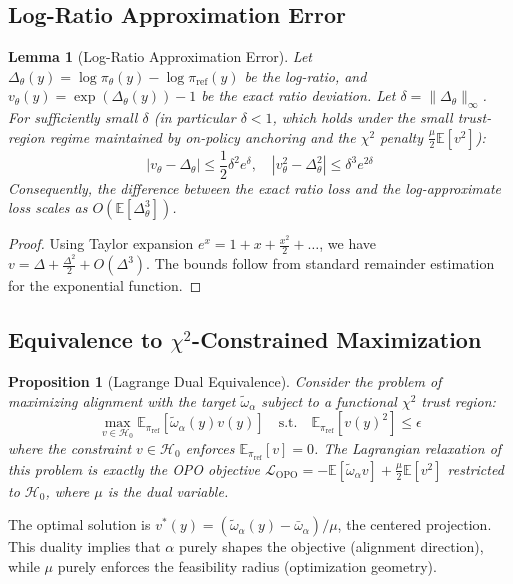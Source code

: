 \documentclass[11pt]{article}
\newtheorem{proposition}[theorem]{Proposition}
\newtheorem{lemma}[theorem]{Lemma}
\theoremstyle{definition}
\theoremstyle{remark}
\newcommand{\E}{\mathbb{E}}
\newcommand{\piref}{\pi_{\mathrm{ref}}}
\begin{document}
\subsection{Log-Ratio Approximation Error}
\begin{lemma}[Log-Ratio Approximation Error]
\label{lem:log_error_app}
Let $\Delta_\theta(y) = \log \pi_\theta(y) - \log \piref(y)$ be the log-ratio, and $v_\theta(y) = \exp(\Delta_\theta(y)) - 1$ be the exact ratio deviation. Let $\delta = \|\Delta_\theta\|_\infty$. For sufficiently small $\delta$ (in particular $\delta < 1$, which holds under the small trust-region regime maintained by on-policy anchoring and the $\chi^2$ penalty $\frac{\mu}{2}\E[v^2]$):
\begin{equation}
    |v_\theta - \Delta_\theta| \le \frac{1}{2}\delta^2 e^\delta, \quad |v_\theta^2 - \Delta_\theta^2| \le \delta^3 e^{2\delta}
\end{equation}
Consequently, the difference between the exact ratio loss and the log-approximate loss scales as $O(\E[\Delta_\theta^3])$.
\end{lemma}

\begin{proof}
Using Taylor expansion $e^x = 1 + x + \frac{x^2}{2} + \dots$, we have $v = \Delta + \frac{\Delta^2}{2} + O(\Delta^3)$. The bounds follow from standard remainder estimation for the exponential function.
\end{proof}

\subsection{Equivalence to $\chi^2$-Constrained Maximization}
\begin{proposition}[Lagrange Dual Equivalence]
Consider the problem of maximizing alignment with the target $\tilde{\omega}_\alpha$ subject to a functional $\chi^2$ trust region:
\begin{equation}
    \max_{v \in \mathcal{H}_0} \E_{\piref}[\tilde{\omega}_\alpha(y) v(y)] \quad \text{s.t.} \quad \E_{\piref}[v(y)^2] \le \epsilon
\end{equation}
where the constraint $v \in \mathcal{H}_0$ enforces $\E_{\piref}[v] = 0$. The Lagrangian relaxation of this problem is exactly the OPO objective $\mathcal{L}_{\text{OPO}} = -\E[\tilde{\omega}_\alpha v] + \frac{\mu}{2} \E[v^2]$ restricted to $\mathcal{H}_0$, where $\mu$ is the dual variable.
\end{proposition}
The optimal solution is $v^*(y) = (\tilde{\omega}_\alpha(y) - \bar{\omega}_\alpha)/\mu$, the centered projection. This duality implies that $\alpha$ purely shapes the objective (alignment direction), while $\mu$ purely enforces the feasibility radius (optimization geometry).
\end{document}
